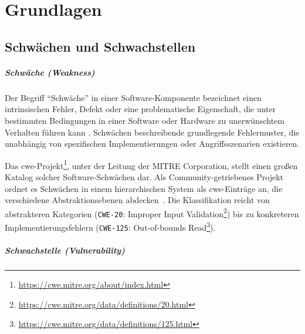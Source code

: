\chapter{Grundlagen}\label{ch:grundlagen}


\section{Schwächen und Schwachstellen}\label{sec:def-weakness-vulnerability}

\paragraph{Schwäche (Weakness)}

Der Begriff \enquote{Schwäche} in einer Software-Komponente bezeichnet einen intrinsischen Fehler, Defekt oder eine problematische Eigenschaft, die unter bestimmten Bedingungen in einer Software oder Hardware zu unerwünschtem Verhalten führen kann \autocite{Ross_Winstead_McEvilley_2022}.
Schwächen beschreibende grundlegende Fehlermuster, die unabhängig von spezifischen Implementierungen oder Angriffsszenarien existieren.

Das \acrfull{cwe}-Projekt\footnote{\url{https://cwe.mitre.org/about/index.html}}, unter der Leitung der MITRE Corporation, stellt einen großen Katalog solcher Software-Schwächen dar.
Als Community-getriebenes Projekt ordnet es Schwächen in einem hierarchischen System als \acrshort{cwe}-Einträge an, die verschiedene Abstraktionsebenen abdecken\ \autocite{wu2016cwe}.
Die Klassifikation reicht von abstrakteren Kategorien (\verb+CWE-20+: Improper Input Validation\footnote{\url{https://cwe.mitre.org/data/definitions/20.html}}) bis zu konkreteren Implementierungsfehlern (\verb+CWE-125+: Out-of-bounds Read\footnote{\url{https://cwe.mitre.org/data/definitions/125.html}}).

\paragraph{Schwachstelle (Vulnerability)}

